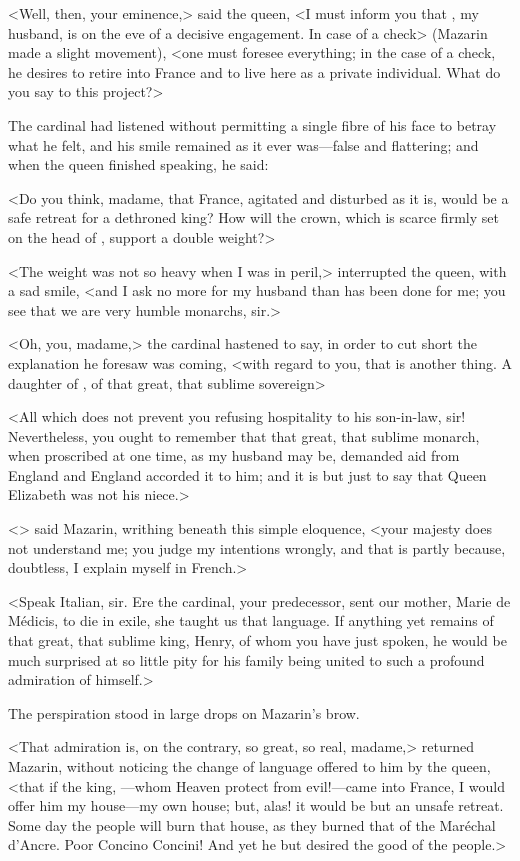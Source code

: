 <Well, then, your eminence,> said the queen, <I must inform you that , my husband, is on the eve of a decisive engagement. In case of a check> (Mazarin made a slight movement), <one must foresee everything; in the case of a check, he desires to retire into France and to live here as a private individual. What do you say to this project?>

The cardinal had listened without permitting a single fibre of his face to betray what he felt, and his smile remained as it ever was—false and flattering; and when the queen finished speaking, he said:

<Do you think, madame, that France, agitated and disturbed as it is, would be a safe retreat for a dethroned king? How will the crown, which is scarce firmly set on the head of , support a double weight?>

<The weight was not so heavy when I was in peril,> interrupted the queen, with a sad smile, <and I ask no more for my husband than has been done for me; you see that we are very humble monarchs, sir.>

<Oh, you, madame,> the cardinal hastened to say, in order to cut short the explanation he foresaw was coming, <with regard to you, that is another thing. A daughter of , of that great, that sublime sovereign\longdash>

<All which does not prevent you refusing hospitality to his son-in-law, sir! Nevertheless, you ought to remember that that great, that sublime monarch, when proscribed at one time, as my husband may be, demanded aid from England and England accorded it to him; and it is but just to say that Queen Elizabeth was not his niece.>

<> said Mazarin, writhing beneath this simple eloquence, <your majesty does not understand me; you judge my intentions wrongly, and that is partly because, doubtless, I explain myself in French.>

<Speak Italian, sir. Ere the cardinal, your predecessor, sent our mother, Marie de Médicis, to die in exile, she taught us that language. If anything yet remains of that great, that sublime king, Henry, of whom you have just spoken, he would be much surprised at so little pity for his family being united to such a profound admiration of himself.>

The perspiration stood in large drops on Mazarin's brow.

<That admiration is, on the contrary, so great, so real, madame,> returned Mazarin, without noticing the change of language offered to him by the queen, <that if the king, —whom Heaven protect from evil!—came into France, I would offer him my house—my own house; but, alas! it would be but an unsafe retreat. Some day the people will burn that house, as they burned that of the Maréchal d'Ancre. Poor Concino Concini! And yet he but desired the good of the people.>

